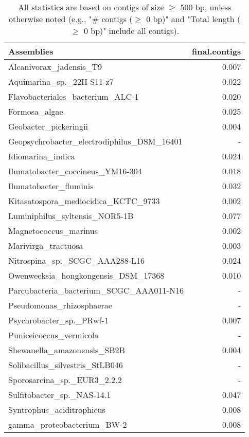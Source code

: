 \documentclass[12pt,a4paper]{article}
\begin{document}
\begin{table}[ht]
\begin{center}
\caption{All statistics are based on contigs of size $\geq$ 500 bp, unless otherwise noted (e.g., "\# contigs ($\geq$ 0 bp)" and "Total length ($\geq$ 0 bp)" include all contigs).}
\begin{tabular}{|l*{1}{|r}|}
\hline
Assemblies & final.contigs \\ \hline
Alcanivorax\_jadensis\_T9 & 0.007 \\ \hline
Aquimarina\_sp.\_22II-S11-z7 & 0.022 \\ \hline
Flavobacteriales\_bacterium\_ALC-1 & 0.020 \\ \hline
Formosa\_algae & 0.025 \\ \hline
Geobacter\_pickeringii & 0.004 \\ \hline
Geopsychrobacter\_electrodiphilus\_DSM\_16401 & - \\ \hline
Idiomarina\_indica & 0.024 \\ \hline
Ilumatobacter\_coccineus\_YM16-304 & 0.018 \\ \hline
Ilumatobacter\_fluminis & 0.032 \\ \hline
Kitasatospora\_mediocidica\_KCTC\_9733 & 0.002 \\ \hline
Luminiphilus\_syltensis\_NOR5-1B & 0.077 \\ \hline
Magnetococcus\_marinus & 0.002 \\ \hline
Marivirga\_tractuosa & 0.003 \\ \hline
Nitrospina\_sp.\_SCGC\_AAA288-L16 & 0.024 \\ \hline
Owenweeksia\_hongkongensis\_DSM\_17368 & 0.010 \\ \hline
Parcubacteria\_bacterium\_SCGC\_AAA011-N16 & - \\ \hline
Pseudomonas\_rhizosphaerae & - \\ \hline
Psychrobacter\_sp.\_PRwf-1 & 0.007 \\ \hline
Puniceicoccus\_vermicola & - \\ \hline
Shewanella\_amazonensis\_SB2B & 0.004 \\ \hline
Solibacillus\_silvestris\_StLB046 & - \\ \hline
Sporosarcina\_sp.\_EUR3\_2.2.2 & - \\ \hline
Sulfitobacter\_sp.\_NAS-14.1 & 0.047 \\ \hline
Syntrophus\_aciditrophicus & 0.008 \\ \hline
gamma\_proteobacterium\_BW-2 & 0.008 \\ \hline
\end{tabular}
\end{center}
\end{table}
\end{document}
